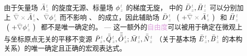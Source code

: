 由于矢量场 $\bar{A}^{\;\!\mathcolor{gray}{t}}_{\;\!\mathcolor{gray}{z}}$ 的旋度\textcolor{NavyBlue}{无源}、标量场 $\phi^{\;\!\mathcolor{gray}{t}}_{\;\!\mathcolor{gray}{z}}$ 的梯度无旋， 中的 $\bar{D}^{\;\!\mathcolor{gray}{t}}_{\;\!\mathcolor{gray}{z}}, \bar{H}^{\;\!\mathcolor{gray}{t}}_{\;\!\mathcolor{gray}{z}}$ 可以分别加上 $\mathcolor{gray}{\bar{\nabla} \times} \bar{A}^{\;\!\mathcolor{gray}{t}}_{\;\!\mathcolor{gray}{z}}$、$\mathcolor{gray}{\bar{\nabla}} \phi^{\;\!\mathcolor{gray}{t}}_{\;\!\mathcolor{gray}{z}}$ 而不影响 、 的成立，因此\textcolor{NavyBlue}{辅助场} $\bar{D}^{\;\!\mathcolor{gray}{t}}_{\;\!\mathcolor{gray}{z}}$ $~\left(~ + \mathcolor{gray}{\bar{\nabla} \times} \bar{A}^{\;\!\mathcolor{gray}{t}}_{\;\!\mathcolor{gray}{z}} ~\right)~$ 和 $\bar{H}^{\;\!\mathcolor{gray}{t}}_{\;\!\mathcolor{gray}{z}}$ $~\left(~ + \mathcolor{gray}{\bar{\nabla}} \phi^{\;\!\mathcolor{gray}{t}}_{\;\!\mathcolor{gray}{z}} ~\right)~$ 都不是唯一确定的。 ---  这一额外的\textcolor{Plum}{自由度}可以被用于确定在微观上与坐标原点无关的平移不变源 $\bar{P}^{\;\!\mathcolor{gray}{t}}_{\;\!\mathcolor{gray}{z}},\bar{\bar{Q}}^{\;\!\mathcolor{gray}{t}}_{\;\!\mathcolor{gray}{z}},\bar{\bar{\bar{O}}}^{\;\!\mathcolor{gray}{t}}_{\;\!\mathcolor{gray}{z}} ; \bar{M}^{\;\!\mathcolor{gray}{t}}_{\;\!\mathcolor{gray}{z}}, \bar{\bar{N}}^{\;\!\mathcolor{gray}{t}}_{\;\!\mathcolor{gray}{z}}$ （关于\textcolor{NavyBlue}{基本场} $\bar{E}^{\;\!\mathcolor{gray}{t}}_{\;\!\mathcolor{gray}{z}}, \bar{B}^{\;\!\mathcolor{gray}{t}}_{\;\!\mathcolor{gray}{z}}$ 的本构关系）的唯一确定且正确的宏观表达式\cite{welterTranslationallyInvariantSemiclassical2013,delangeTranslationalInvariancePost2012,langeTransitionMicroscopicMacroscopic2012,langeMultipoleTheoryHehl2015,raabCommentOriginDependence2010a,OriginindependentCalculationQuadrupole}。

